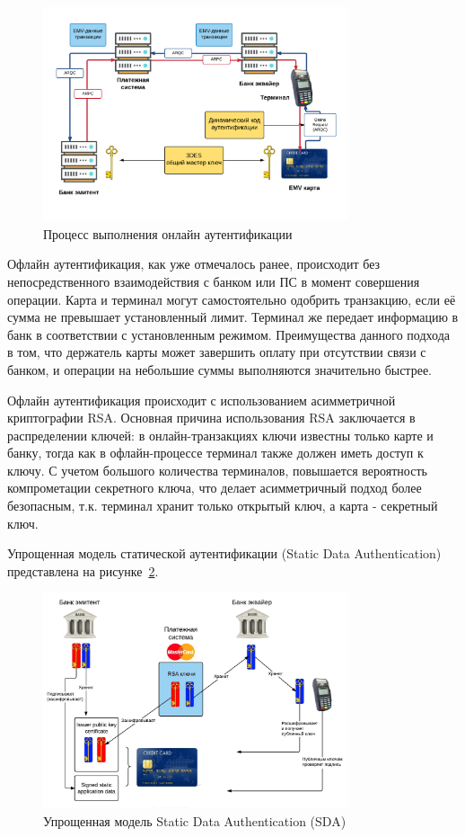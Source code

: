 \begin{figure}[H]
    \centering
    \includegraphics[width=0.8\textwidth]{images/research/online_auth}
    \caption{\centering Процесс выполнения онлайн аутентификации}
    \label{fig:online_auth}
\end{figure}


Офлайн аутентификация, как уже отмечалось ранее, происходит без непосредственного взаимодействия с банком или ПС в момент совершения операции.
Карта и терминал могут самостоятельно одобрить транзакцию, если её сумма не превышает установленный лимит.
Терминал же передает информацию в банк в соответствии с установленным режимом.
Преимущества данного подхода в том, что держатель карты может завершить оплату при отсутствии связи с банком, и операции на небольшие суммы выполняются значительно быстрее.

Офлайн аутентификация происходит с использованием асимметричной криптографии RSA.
Основная причина использования RSA заключается в распределении ключей: в онлайн-транзакциях ключи известны только карте и банку, тогда как в офлайн-процессе терминал также должен иметь доступ к ключу.
С учетом большого количества терминалов, повышается вероятность компрометации секретного ключа, что делает асимметричный подход более безопасным, т.к. терминал хранит только открытый ключ, а карта - секретный ключ.

Упрощенная модель статической аутентификации (Static Data Authentication) представлена на рисунке~\ref{fig:sda}.

\begin{figure}[H]
    \centering
    \includegraphics[width=0.8\textwidth]{images/research/sda}
    \caption{\centering Упрощенная модель Static Data Authentication (SDA)}
    \label{fig:sda}
\end{figure}

